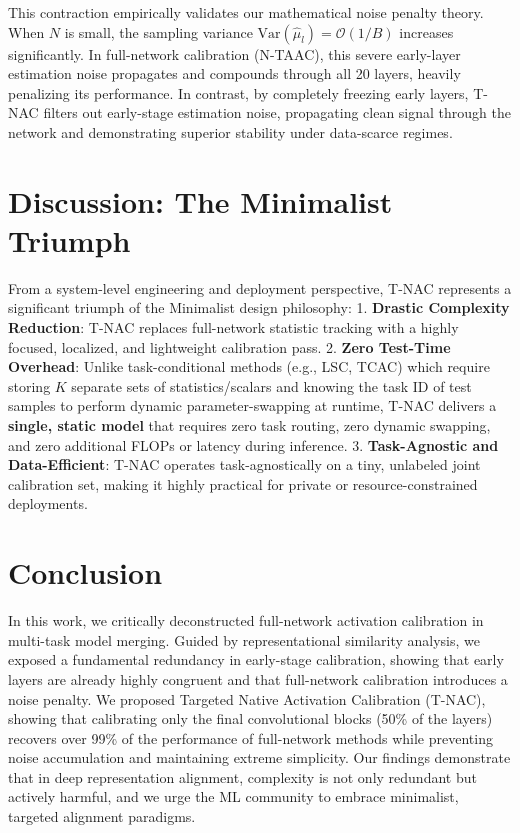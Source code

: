 \documentclass{article}
\theoremstyle{plain}
\theoremstyle{definition}
\begin{document}
This contraction empirically validates our mathematical noise penalty theory. When $N$ is small, the sampling variance $\text{Var}(\hat{\mu}_l) = \mathcal{O}(1/B)$ increases significantly. In full-network calibration (N-TAAC), this severe early-layer estimation noise propagates and compounds through all 20 layers, heavily penalizing its performance. In contrast, by completely freezing early layers, T-NAC filters out early-stage estimation noise, propagating clean signal through the network and demonstrating superior stability under data-scarce regimes.

\section{Discussion: The Minimalist Triumph}
From a system-level engineering and deployment perspective, T-NAC represents a significant triumph of the Minimalist design philosophy:
1.  \textbf{Drastic Complexity Reduction}: T-NAC replaces full-network statistic tracking with a highly focused, localized, and lightweight calibration pass.
2.  \textbf{Zero Test-Time Overhead}: Unlike task-conditional methods (e.g., LSC, TCAC) which require storing $K$ separate sets of statistics/scalars and knowing the task ID of test samples to perform dynamic parameter-swapping at runtime, T-NAC delivers a \textbf{single, static model} that requires zero task routing, zero dynamic swapping, and zero additional FLOPs or latency during inference.
3.  \textbf{Task-Agnostic and Data-Efficient}: T-NAC operates task-agnostically on a tiny, unlabeled joint calibration set, making it highly practical for private or resource-constrained deployments.

\section{Conclusion}
In this work, we critically deconstructed full-network activation calibration in multi-task model merging. Guided by representational similarity analysis, we exposed a fundamental redundancy in early-stage calibration, showing that early layers are already highly congruent and that full-network calibration introduces a noise penalty. We proposed Targeted Native Activation Calibration (T-NAC), showing that calibrating only the final convolutional blocks (50\% of the layers) recovers over 99\% of the performance of full-network methods while preventing noise accumulation and maintaining extreme simplicity. Our findings demonstrate that in deep representation alignment, complexity is not only redundant but actively harmful, and we urge the ML community to embrace minimalist, targeted alignment paradigms.
\end{document}
